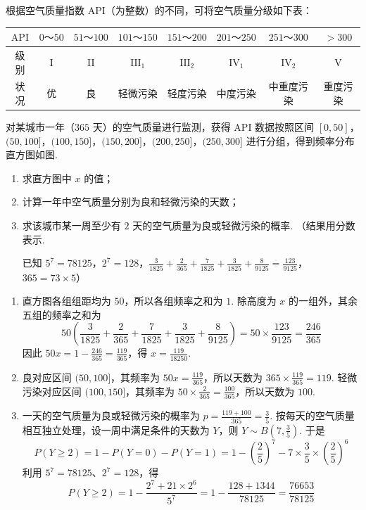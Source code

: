 \begin{problem}
根据空气质量指数 \(\mathrm{API}\)（为整数）的不同，可将空气质量分级如下表：

\begin{center}
\begin{tabular}{c|ccccccc}
\hline
\(\mathrm{API}\) & \(0\text{～}50\) & \(51\text{～}100\) & \(101\text{～}150\) & \(151\text{～}200\) & \(201\text{～}250\) & \(251\text{～}300\) & \(>300\) \\
\hline
级别 & I & II & \(\mathrm{III}_1\) & \(\mathrm{III}_2\) & \(\mathrm{IV}_1\) & \(\mathrm{IV}_2\) & V \\
\hline
状况 & 优 & 良 & 轻微污染 & 轻度污染 & 中度污染 & 中重度污染 & 重度污染 \\
\hline
\end{tabular}
\end{center}

对某城市一年（\(365\text{ 天}\)）的空气质量进行监测，获得 \(\mathrm{API}\) 数据按照区间 \([0, 50]\)，\((50, 100]\)，\((100, 150]\)，\((150, 200]\)，\((200, 250]\)，\((250, 300]\) 进行分组，得到频率分布直方图如图.

\begin{enumerate}
\item 求直方图中 \(x\) 的值；
\item 计算一年中空气质量分别为良和轻微污染的天数；
\item 求该城市某一周至少有 \(2\) 天的空气质量为良或轻微污染的概率. （结果用分数表示.

已知 \(5^7 = 78125\)，\(2^7 = 128\)，\(\frac{3}{1825} + \frac{2}{365} + \frac{7}{1825} + \frac{3}{1825} + \frac{8}{9125} = \frac{123}{9125}\)，\(365 = 73 \times 5\)）
\end{enumerate}

\begingroup
\leftskip=0pt
\rightskip=0pt
\endgroup
\end{problem}

\begin{solution}
\begin{enumerate}
\item 直方图各组组距均为 \(50\)，所以各组频率之和为 \(1\). 除高度为 \(x\) 的一组外，其余五组的频率之和为
\[
50\left(\frac3{1825}+\frac2{365}+\frac7{1825}+\frac3{1825}+\frac8{9125}\right)=50\times\frac{123}{9125}=\frac{246}{365}
\]
因此 \(50x=1-\frac{246}{365}=\frac{119}{365}\)，得 \(x=\frac{119}{18250}\).
\item 良对应区间 \((50,100]\)，其频率为 \(50x=\frac{119}{365}\)，所以天数为 \(365\times\frac{119}{365}=119\). 轻微污染对应区间 \((100,150]\)，其频率为 \(50\times\frac2{365}=\frac{100}{365}\)，所以天数为 \(100\).
\item 一天的空气质量为良或轻微污染的概率为 \(p=\frac{119+100}{365}=\frac35\). 按每天的空气质量相互独立处理，设一周中满足条件的天数为 \(Y\)，则 \(Y\sim B\left(7,\frac35\right)\). 于是
\[
P(Y\geqslant2)=1-P(Y=0)-P(Y=1)=1-\left(\frac25\right)^7-7\times\frac35\times\left(\frac25\right)^6
\]
利用 \(5^7=78125\)、\(2^7=128\)，得
\[
P(Y\geqslant2)=1-\frac{2^7+21\times2^6}{5^7}=1-\frac{128+1344}{78125}=\frac{76653}{78125}
\]
\end{enumerate}
\end{solution}

